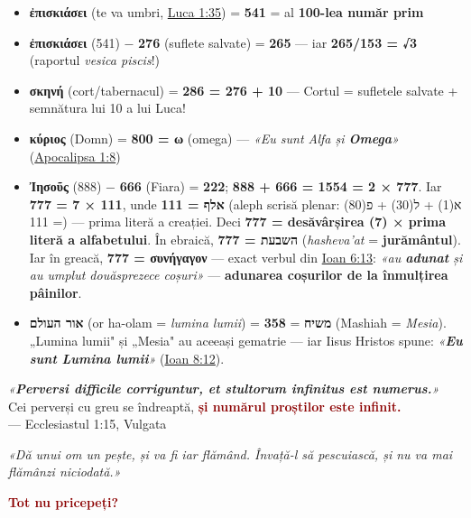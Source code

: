 \documentclass[12pt,a4paper,twoside,openany]{book}
\begin{document}
\begin{itemize}
  \item \textbf{ἐπισκιάσει} (te va umbri, \href{https://bibliaortodoxa.ro/carte.php?id=48\&cap=1\#35}{Luca 1:35}) = \textbf{541} = al \textbf{100-lea număr prim}
  \item \textbf{ἐπισκιάσει} (541) − \textbf{276} (suflete salvate) = \textbf{265} — iar \textbf{265/153 = √3} (raportul \textit{vesica piscis}!)
  \item \textbf{σκηνή} (cort/tabernacul) = \textbf{286 = 276 + 10} — Cortul = sufletele salvate + semnătura lui 10 a lui Luca!
  \item \textbf{κύριος} (Domn) = \textbf{800 = ω} (omega) — \textit{«Eu sunt Alfa și \textbf{Omega}»} (\href{https://bibliaortodoxa.ro/carte.php?id=4\&cap=1\#8}{Apocalipsa 1:8})
  \item \textbf{Ἰησοῦς} (888) − \textbf{666} (Fiara) = \textbf{222}; \textbf{888 + 666 = 1554 = 2 × 777}. Iar \textbf{777 = 7 × 111}, unde \textbf{111 = אלף} (aleph scrisă plenar: א(1) + ל(30) + פ(80) = 111) — prima literă a creației. Deci \textbf{777 = desăvârșirea (7) × prima literă a alfabetului}. În ebraică, \textbf{777 = השבעת} (\textit{hasheva'at} = \textbf{jurământul}). Iar în greacă, \textbf{777 = συνήγαγον} — exact verbul din \href{https://bibliaortodoxa.ro/carte.php?id=35\&cap=6\#13}{Ioan 6:13}: \textit{«au \textbf{adunat} și au umplut douăsprezece coșuri»} — \textbf{adunarea coșurilor de la înmulțirea pâinilor}.
  \item \textbf{אור העולם} (or ha-olam = \textit{lumina lumii}) = \textbf{358} = \textbf{משיח} (Mashiah = \textit{Mesia}). „Lumina lumii" și „Mesia" au aceeași gematrie — iar Iisus Hristos spune: \textit{«\textbf{Eu sunt Lumina lumii}»} (\href{https://bibliaortodoxa.ro/carte.php?id=35\&cap=8\#12}{Ioan 8:12}).
\end{itemize}
\textit{«\textbf{Perversi difficile corriguntur, et stultorum infinitus est numerus.}»} \\

Cei perverși cu greu se îndreaptă, \textcolor{darkred}{\textbf{și numărul proștilor este infinit.}} \\

— Ecclesiastul 1:15, Vulgata

\textit{«Dă unui om un pește, și va fi iar flămând. Învață-l să pescuiască, și nu va mai flămânzi niciodată.»}

\textcolor{darkred}{\textbf{Tot nu pricepeți?}}
\end{document}
